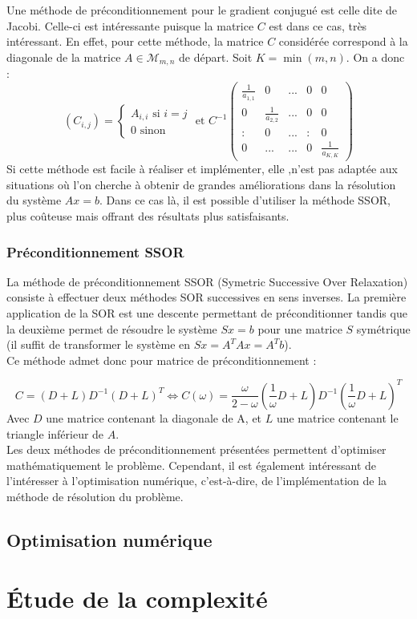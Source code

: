 Une méthode de préconditionnement pour le gradient conjugué est celle dite de Jacobi. Celle-ci est intéressante puisque la matrice $C$ est dans ce cas, très intéressant. En effet, pour cette méthode, la matrice $C$ considérée correspond à la diagonale de la matrice $A\in\mathcal{M}_{m,n}$ de départ. Soit $K=\min(m,n)$. On a donc :
$$
(C_{i,j})=
\begin{cases}
A_{i,i}\text{ si }i=j\\
0\text{ sinon }
\end{cases}
\text{ et }
C^{-1}
\begin{pmatrix}
\frac{1}{a_{1,1}}&0&...&0&0\\
0&\frac{1}{a_{2,2}}&...&0&0\\
:&0&...&:&0\\
0&...&...&0&\frac{1}{a_{K,K}}
\end{pmatrix}
$$
Si cette méthode est facile à réaliser et implémenter, elle ,n'est pas adaptée aux situations où l'on cherche à obtenir de grandes améliorations dans la résolution du système $Ax=b$. Dans ce cas là, il est possible d'utiliser la méthode SSOR, plus coûteuse mais offrant des résultats plus satisfaisants.
\subsubsection{Préconditionnement SSOR}
La méthode de préconditionnement SSOR (Symetric Successive Over Relaxation) consiste à effectuer deux méthodes SOR successives en sens inverses. La première application de la SOR est une descente permettant de préconditionner tandis que la deuxième permet de résoudre le système $Sx=b$ pour une matrice $S$ symétrique (il suffit de transformer le système en $Sx=A^TAx=A^Tb$).\\

Ce méthode admet donc pour matrice de préconditionnement :

$$
C=(D+L)D^{-1}(D+L)^T\Leftrightarrow C(\omega)=\frac{\omega}{2-\omega}(\frac{1}{\omega}D+L)D^{-1}(\frac{1}{\omega}D+L)^T
$$
Avec $D$ une matrice contenant la diagonale de A, et $L$ une matrice contenant le triangle inférieur de $A$.\\

Les deux méthodes de préconditionnement présentées permettent d'optimiser mathématiquement le problème. Cependant, il est également intéressant de l'intéresser à l'optimisation numérique, c'est-à-dire, de l'implémentation de la méthode de résolution du problème.
\subsection{Optimisation numérique}

\section{Étude de la complexité}
